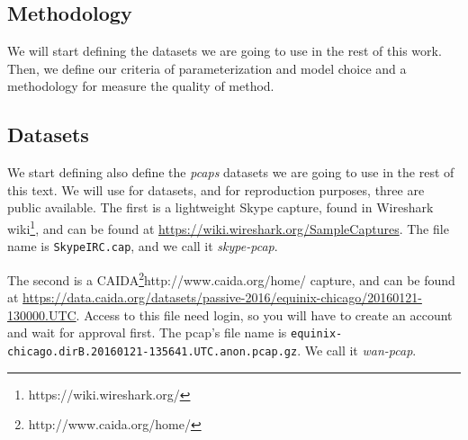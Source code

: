 



\subsection{Methodology}

We will start defining the datasets we are going to use in the rest of this work. Then, we define our criteria of parameterization and model choice and a methodology for measure the quality of method. 



\subsection{Datasets}

We start defining also define the \textit{pcaps} datasets we are going to use in the rest of this text. We will use for datasets, and for reproduction purposes, three are public available. 
The first is a lightweight Skype capture, found in  Wireshark wiki\footnote{https://wiki.wireshark.org/}, and can be found at \href{https://wiki.wireshark.org/SampleCaptures}{https://wiki.wireshark.org/SampleCaptures}. The file name is \texttt{SkypeIRC.cap}, and we call it \textit{skype-pcap}.

The second is a CAIDA\footnote{http://www.caida.org/home/}{http://www.caida.org/home/} capture, and can be found at  \href{https://data.caida.org/datasets/passive-2016/equinix-chicago/20160121-130000.UTC}{https://data.caida.org/datasets/passive-2016/equinix-chicago/20160121-130000.UTC}. Access to this file need login, so you will have to create an account and wait for approval first. The pcap's file name is \texttt{equinix-chicago.dirB.20160121-135641.UTC.anon.pcap.gz}. We call it \textit{wan-pcap}.

